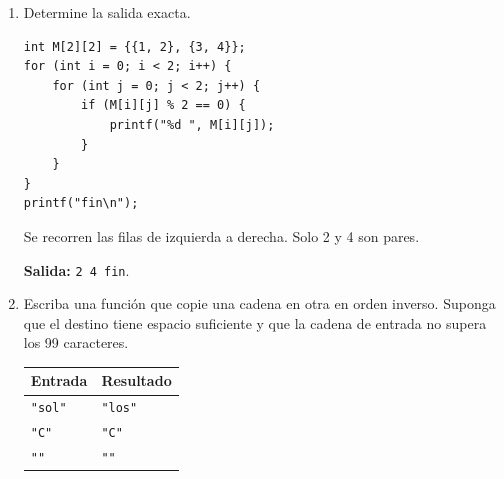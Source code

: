 \begin{enumerate}[label=\textbf{\arabic*.}]
\begin{enumerate}[label=(\alph*)]
\item Escriba la condición que comprueba la validez.
\ifpauta\begin{solucionbox}\texttt{unidades >= 1 \&\& unidades <= 500}.\end{solucionbox}\else\vspace{1.5cm}\fi
\item Escriba un fragmento \texttt{if-else} que imprima \texttt{Dentro de rango} o \texttt{Fuera de rango}.
\ifpauta\begin{solucionbox}\begin{lstlisting}[style=customc]
if (unidades >= 1 && unidades <= 500) {
    printf("Dentro de rango\n");
} else {
    printf("Fuera de rango\n");
}
\end{lstlisting}\end{solucionbox}\else\vspace{2cm}\fi
\item Clasifique \texttt{1}, \texttt{250}, \texttt{500} y \texttt{501}.
\ifpauta\begin{solucionbox}1, 250 y 500 son válidos; 501 está fuera del rango.\end{solucionbox}\else\vspace{2cm}\fi
\end{enumerate}
\newpage
\item Determine la salida exacta.
\begin{lstlisting}[style=customc]
int M[2][2] = {{1, 2}, {3, 4}};
for (int i = 0; i < 2; i++) {
    for (int j = 0; j < 2; j++) {
        if (M[i][j] % 2 == 0) {
            printf("%d ", M[i][j]);
        }
    }
}
printf("fin\n");
\end{lstlisting}
\ifpauta\begin{solucionbox}Se recorren las filas de izquierda a derecha. Solo 2 y 4 son pares.\par\textbf{Salida:} \texttt{2 4 fin}.\end{solucionbox}\else\vspace{3cm}\fi
\item Escriba una función que copie una cadena en otra en orden inverso. Suponga que el destino tiene espacio suficiente y que la cadena de entrada no supera los 99 caracteres.
\begin{center}\begin{tabular}{ll}\toprule\textbf{Entrada} & \textbf{Resultado}\\\midrule\texttt{"sol"} & \texttt{"los"}\\\texttt{"C"} & \texttt{"C"}\\\texttt{""} & \texttt{""}\\\bottomrule\end{tabular}\end{center}

\end{enumerate}
